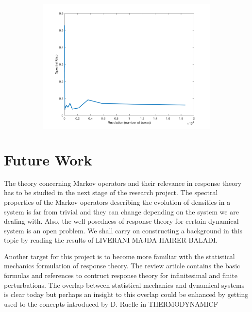 \begin{figure}[H]
\begin{subfigure}[b]{0.4\textwidth}
	\end{subfigure}
	\begin{subfigure}[b]{0.4\textwidth}
		\includegraphics[width=\textwidth]{spectruml84.png}
    \end{subfigure}
	\caption{}
\end{figure}

\section*{Future Work}

The theory concerning Markov operators and their relevance in response theory has to be studied in the next stage of the research project. The spectral properties of the Markov operators describing the evolution of densities in a system is far from trivial and they can change depending on the system we are dealing with. Also, the well-posedness of response theory for certain dynamical system is an open problem. We shall carry on constructing a background in this topic by reading the results of LIVERANI MAJDA HAIRER BALADI.

Another target for this project is to become more familiar with the statistical mechanics formulation of response theory. The review article \cite{review} contains the basic formulas and references to contruct response theory for infinitesimal and finite perturbations. The overlap between statistical mechanics and dynamical systems is clear today but perhaps an insight to this overlap could be enhanced by getting used to the concepts introduced by D. Ruelle in THERMODYNAMICF

